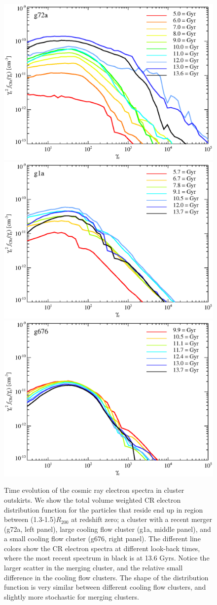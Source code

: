 \documentclass[useAMS,usenatbib]{mn2e}
\newcommand{\rvir}{R_{200}}
\begin{document}
\begin{figure}
\begin{minipage}{2.0\columnwidth}
  \includegraphics[width=0.32\columnwidth]{./figures/f_z.g72a.1.4Rv.a24.full.v20.eps}
  \includegraphics[width=0.32\columnwidth]{./figures/f_z.g1a.1.4Rv.a24.full.v20.eps}
  \includegraphics[width=0.32\columnwidth]{./figures/f_z.g676.1.4Rv.a24.full.v20.eps}
  \caption{Time evolution of the cosmic ray electron spectra in
    cluster outskirts. We show the total volume weighted CR electron
    distribution function for the particles that reside end up in
    region between (1.3-1.5)$\rvir$ at redshift zero; a cluster with a
    recent merger (g72a, left panel), large cooling flow cluster (g1a,
    middle panel), and a small cooling flow cluster (g676, right
    panel). The different line colors show the CR electron spectra at
    different look-back times, where the most recent spectrum in black
    is at 13.6 Gyrs. Notice the larger scatter in the merging cluster,
    and the relative small difference in the cooling flow
    clusters. The shape of the distribution function is very similar
    between different cooling flow clusters, and slightly more
    stochastic for merging clusters.\label{fig:e_spec_z}}
\end{minipage}
\end{figure}
\end{document}
